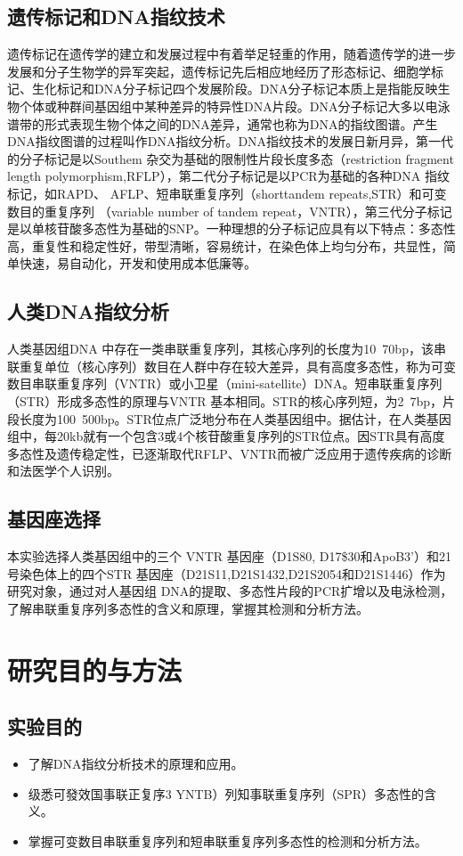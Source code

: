 \documentclass[AutoFakeBold]{LZUThesis}
\begin{document}
\section{遗传标记和DNA指纹技术}
遗传标记在遗传学的建立和发展过程中有着举足轻重的作用，随着遗传学的进一步发展和分子生物学的异军突起，遗传标记先后相应地经历了形态标记、细胞学标记、生化标记和DNA分子标记四个发展阶段。DNA分子标记本质上是指能反映生物个体或种群间基因组中某种差异的特异性DNA片段。DNA分子标记大多以电泳谱带的形式表现生物个体之间的DNA差异，通常也称为DNA的指纹图谱。产生DNA指纹图谱的过程叫作DNA指纹分析。DNA指纹技术的发展日新月异，第一代的分子标记是以Southem 杂交为基础的限制性片段长度多态（restriction fragment length polymorphism,RFLP），第二代分子标记是以PCR\cite{saiki1985enzymatic}为基础的各种DNA 指纹标记，如RAPD、 AFLP、短串联重复序列（shorttandem repeats,STR）和可变数目的重复序列 （variable number of tandem repeat，VNTR），第三代分子标记是以单核苷酸多态性为基础的SNP。一种理想的分子标记应具有以下特点：多态性高，重复性和稳定性好，带型清晰，容易统计，在染色体上均匀分布，共显性，简单快速，易自动化，开发和使用成本低廉等。\par
\section{人类DNA指纹分析}
人类基因组DNA 中存在一类串联重复序列，其核心序列的长度为10~70bp，该串联重复单位（核心序列）数目在人群中存在较大差异，具有高度多态性，称为可变数目串联重复序列（VNTR）或小卫星（mini-satellite）DNA。短串联重复序列（STR）形成多态性的原理与VNTR 基本相同。STR的核心序列短，为2~7bp，片段长度为100~500bp。STR位点广泛地分布在人类基因组中。据估计，在人类基因组中，每20kb就有一个包含3或4个核苷酸重复序列的STR位点。因STR具有高度多态性及遗传稳定性，已逐渐取代RFLP、VNTR而被广泛应用于遗传疾病的诊断和法医学个人识别。\par
\section{基因座选择}
本实验选择人类基因组中的三个 VNTR 基因座（D1S80, D17\$30和ApoB3’）和21号染色体上的四个STR 基因座（D21S11,D21S1432,D21S2054和D21S1446）作为研究对象，通过对人基因组 DNA的提取、多态性片段的PCR扩增以及电泳检测，了解串联重复序列多态性的含义和原理，掌握其检测和分析方法。\par

\chapter{研究目的与方法}
\section{实验目的}
\begin{itemize}
    \item 了解DNA指纹分析技术的原理和应用。
    \item 级悉可發效国事联正复序3 YNTB）列知事联重复序列（SPR）多态性的含义。
    \item 掌握可变数目串联重复序列和短串联重复序列多态性的检测和分析方法。
\end{itemize}
\end{document}
